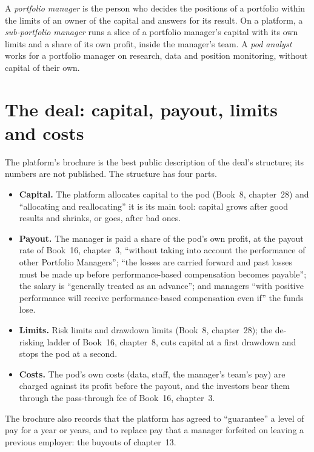 \begin{definition}\label{def:in:portfolio-manager-and-pod-analyst:roles}
A \emph{portfolio manager} is the person who decides the positions of a portfolio within the
limits of an owner of the capital and answers for its result. On a platform, a \emph{sub-portfolio
manager} runs a slice of a portfolio manager's capital with its own limits and a share of
its own profit, inside the manager's team. A \emph{pod analyst} works for a portfolio manager on
research, data and position monitoring, without capital of their own.
\end{definition}

\section{The deal: capital, payout, limits and costs}

The platform's brochure is the best public description of the deal's structure; its numbers are not published. The
structure has four parts.
\begin{itemize}
\item \textbf{Capital.} The platform allocates capital to the pod (Book~8, chapter~28) and ``allocating and
reallocating'' it is its main tool: capital grows after good results and shrinks, or goes, after bad ones.
\item \textbf{Payout.} The manager is paid a share of the pod's own profit, at the payout rate of Book~16, chapter~3,
``without taking into account the performance of other Portfolio Managers''; ``the losses are carried forward and past
losses must be made up before performance-based compensation becomes payable''; the salary is ``generally treated as an
advance''; and managers ``with positive performance will receive performance-based compensation even if'' the funds lose.
\item \textbf{Limits.} Risk limits and drawdown limits (Book~8, chapter~28); the de-risking ladder of Book~16, chapter~8,
cuts capital at a first drawdown and stops the pod at a second.
\item \textbf{Costs.} The pod's own costs (data, staff, the manager's team's pay) are charged against its profit before
the payout, and the investors bear them through the pass-through fee of Book~16, chapter~3.
\end{itemize}
The brochure also records that the platform has agreed to ``guarantee'' a level of pay for a year or years, and to
replace pay that a manager forfeited on leaving a previous employer: the buyouts of chapter~13.

